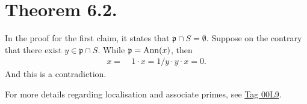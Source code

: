 \section{Theorem 6.2.}

In the proof for the first claim, it states that $\mathfrak p\cap S=\emptyset$. 
Suppose on the contrary that there exist $y\in \mathfrak p\cap S$. While $\mathfrak p=\operatorname{Ann}(x)$, then 
\begin{align*}
    x =&~ 1 \cdot x = 1/y\cdot y \cdot x = 0.
\end{align*}And this is a contradiction. 

For more details regarding localisation and associate primes, see \href{https://stacks.math.columbia.edu/tag/00L9}{Tag 00L9}.